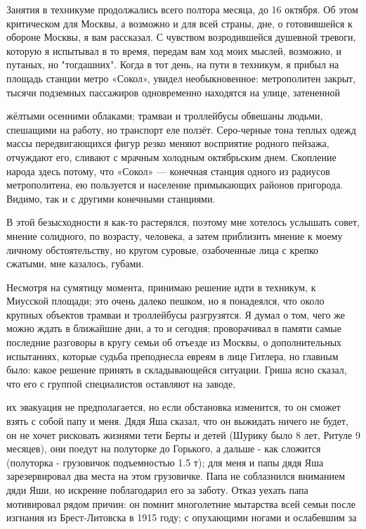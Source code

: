 \label{211-1}
Занятия в техникуме продолжались всего полтора месяца, до 16 октября. Об этом критическом для Москвы, а возможно и для всей страны, дне, о готовившейся к обороне Москвы, я вам рассказал. С чувством возродившейся душевной тревоги, которую я испытывал в то время, передам вам ход моих мыслей, возможно, и путаных, но "тогдашних". Когда в тот день, на пути в техникум, я прибыл на площадь станции метро «Сокол», увидел необыкновенное: метрополитен закрыт, тысячи подземных пассажиров одновременно находятся на улице, затененной

\label{212-1}
жёлтыми осенними облаками; трамваи и троллейбусы обвешаны людьми, спешащими на работу, но транспорт еле ползёт. Серо-черные тона теплых одежд массы передвигающихся фигур резко меняют восприятие родного пейзажа, отчуждают его, сливают с мрачным холодным октябрьским днем. Скопление народа здесь потому, что «Сокол» — конечная станция одного из радиусов метрополитена, ею пользуется и население примыкающих районов пригорода. Видимо, так и с другими конечными станциями.

\label{213-1}
В этой безысходности я как-то растерялся, поэтому мне хотелось услышать совет, мнение солидного, по возрасту, человека, а затем приблизить мнение к моему личному обстоятельству, но кругом суровые, озабоченные лица с крепко сжатыми, мне казалось, губами.

\label{214-1}
Несмотря на сумятицу момента, принимаю решение идти в техникум, к    Миусской площади; это очень далеко пешком, но я понадеялся, что около крупных объектов трамваи и троллейбусы разгрузятся. Я думал о том, чего же можно ждать в ближайшие дни, а то и сегодня; проворачивал в памяти самые последние разговоры в кругу семьи об отъезде из Москвы, о дополнительных испытаниях, которые судьба преподнесла евреям в лице Гитлера, но главным было: какое решение принять в складывающейся ситуации. Гриша ясно сказал, что его с группой специалистов оставляют на заводе,

\label{215-1}
их эвакуация не предполагается, но если обстановка изменится, то он сможет взять с собой папу и меня. Дядя Яша сказал, что он выжидать ничего не будет, он не хочет рисковать жизнями тети Берты и детей (Шурику было 8 лет, Ритуле 9 месяцев), они поедут на полуторке до Горького, а дальше - как сложится (полуторка - грузовичок подъемностью 1.5 т); для меня и папы дядя Яша зарезервировал два места на этом грузовичке. Папа не соблазнился вниманием дяди Яши, но искренне поблагодарил его за заботу. Отказ уехать папа мотивировал рядом причин: он помнит многолетние мытарства всей семьи после изгнания из Брест-Литовска в 1915 году; с опухающими ногами и ослабевшим за


